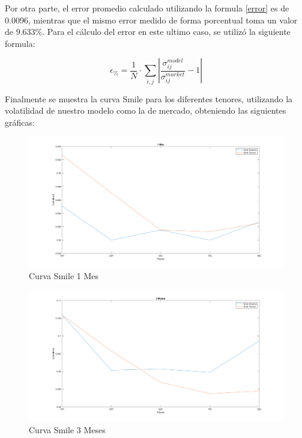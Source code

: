 \noindent Por otra parte, el error promedio calculado utilizando la formula \ref{error} es de 0.0096, mientras que el mismo error medido de forma porcentual toma un valor de 9.633\%. Para el cálculo del error en este ultimo caso, se utilizó la siguiente formula:

\begin{equation}
\epsilon_{\%}=\frac{1}{N} \cdot \sum_{i, j}\left|   \frac{\sigma_{i j}^{m o d e l}}{\sigma_{i j}^{m a r k e t}}-1     \right|
\end{equation}

\noindent Finalmente se muestra la curva Smile para los diferentes tenores, utilizando la volatilidad de nuestro modelo como la de mercado, obteniendo las siguientes gráficas:

\begin{figure}[H]
    \begin{center}
    \includegraphics[width = 14cm]{figures/Smile2d1Mes.png}
    \caption{Curva Smile 1 Mes}
    \label{1SmileDia1} %
    \end{center}
\end{figure}
\begin{figure}[H]
    \begin{center}
    \includegraphics[width = 14cm]{figures/Smile2d3Meses.png}
    \caption{Curva Smile 3 Meses}
    \label{2SmileDia1} %
    \end{center}
\end{figure}
